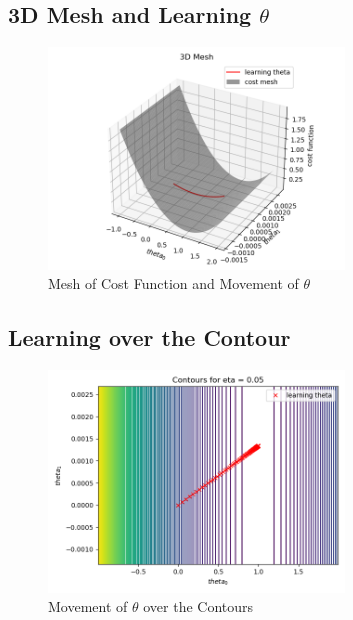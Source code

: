 \documentclass[11pt]{article}
\begin{document}
\subsection{3D Mesh and Learning $\theta$}
\begin{figure}[H]
    \centering
    \includegraphics[width=0.7\textwidth]{Q1/output/c.png}
    \caption{Mesh of Cost Function and Movement of $\theta$}
\end{figure}

\subsection{Learning over the Contour}
\begin{figure}[H]
    \centering
    \includegraphics[width=0.7\textwidth]{Q1/output/d.png}
    \caption{Movement of $\theta$ over the Contours}
\end{figure}
\end{document}
